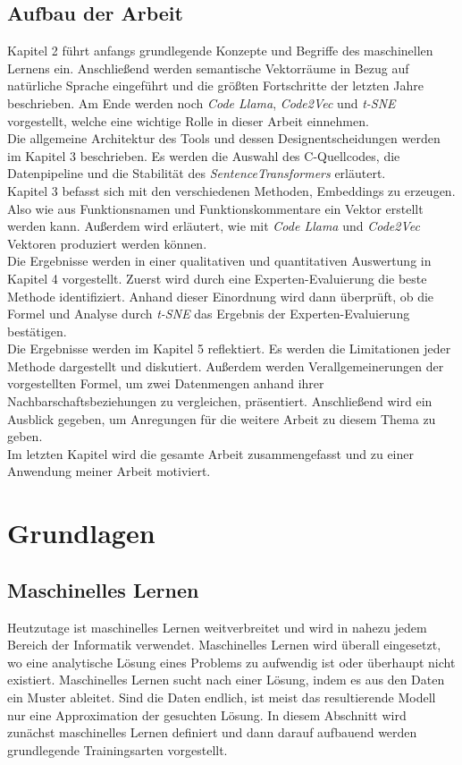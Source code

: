 \documentclass[12pt,letterpaper,ngerman]{article}
\begin{document}
\subsection{Aufbau der Arbeit}
Kapitel 2 führt anfangs grundlegende Konzepte und Begriffe des
maschinellen Lernens ein. Anschließend werden semantische 
Vektorräume in Bezug auf natürliche Sprache eingeführt und die
größten Fortschritte der letzten Jahre 
beschrieben. Am Ende werden noch \textit{Code Llama},  
\textit{Code2Vec} und \textit{t-SNE} vorgestellt, welche eine 
wichtige Rolle in dieser Arbeit einnehmen.\\
Die allgemeine Architektur des Tools und dessen Designentscheidungen werden im Kapitel 3
beschrieben. Es werden die Auswahl des C-Quellcodes, die Datenpipeline und die 
Stabilität des \textit{SentenceTransformers} erläutert.\\
Kapitel 3 befasst sich mit den verschiedenen Methoden, Embeddings
zu erzeugen. Also wie aus Funktionsnamen und Funktionskommentare 
ein Vektor erstellt werden kann. Außerdem wird erläutert, wie mit
\textit{Code Llama} und  \textit{Code2Vec} Vektoren produziert
werden können.\\
Die Ergebnisse werden in einer qualitativen und quantitativen 
Auswertung in Kapitel 4 vorgestellt. Zuerst wird durch eine 
Experten-Evaluierung die beste
Methode identifiziert. Anhand dieser Einordnung wird dann 
überprüft, ob die Formel und Analyse durch \textit{t-SNE} 
das Ergebnis der Experten-Evaluierung bestätigen.\\
Die Ergebnisse werden im Kapitel 5 reflektiert.
Es werden die Limitationen jeder 
Methode dargestellt und diskutiert.
Außerdem werden Verallgemeinerungen der vorgestellten Formel,
um zwei Datenmengen
anhand ihrer Nachbarschaftsbeziehungen zu
vergleichen, präsentiert.
Anschließend wird ein Ausblick gegeben, um Anregungen
für die weitere Arbeit zu diesem Thema zu geben.\\
Im letzten Kapitel wird die gesamte Arbeit zusammengefasst und 
zu einer Anwendung meiner Arbeit motiviert.
\pagebreak
\section{Grundlagen}
\subsection{Maschinelles Lernen}
Heutzutage ist maschinelles Lernen weitverbreitet und wird in nahezu jedem
Bereich der Informatik verwendet.  Maschinelles Lernen wird überall
eingesetzt, wo eine analytische Lösung eines Problems zu aufwendig
ist oder überhaupt nicht existiert. Maschinelles Lernen sucht nach einer Lösung, indem 
es aus den Daten ein Muster ableitet. Sind die Daten endlich, ist meist das 
resultierende Modell nur eine Approximation der gesuchten Lösung. In diesem 
Abschnitt wird zunächst maschinelles Lernen definiert und dann
darauf aufbauend werden grundlegende Trainingsarten vorgestellt.
\end{document}
